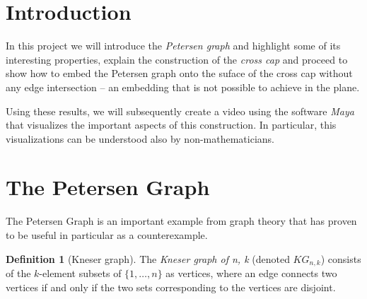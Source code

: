 \documentclass[11pt,            %
               a4paper,         %
               oneside,         %
               DIV12,           %
               fleqn,           %
               halfparskip,     %
               nochapterprefix, %
               bibtotocnumbered,%
              ]{scrartcl} %
\theoremstyle{definition}
\newtheorem{definition}{Definition}
\begin{document}
%
%
%




\section*{Introduction}

In this project we will introduce the \emph{Petersen graph} and highlight
some of its interesting properties, explain the construction of the
\emph{cross cap} and proceed to show how to embed the Petersen graph
onto the suface of the cross cap without any edge intersection --
an embedding that is not possible to achieve in the plane.

Using these results, we will subsequently create a video
using the software \emph{Maya} that visualizes the important aspects
of this construction. In particular, this visualizations can be
understood also by non-mathematicians.

\section{The Petersen Graph}

The Petersen Graph is an important example from graph theory that has
proven to be useful in particular as a counterexample.

\begin{definition}[Kneser graph]
  The \emph{Kneser graph of n, k} (denoted $KG_{n,k}$) consists of
  the $k$-element subsets of $\{1,\ldots,n\}$ as vertices, where an
  edge connects two vertices if and only if the two sets corresponding
  to the vertices are disjoint.
\end{definition}
\end{document}
